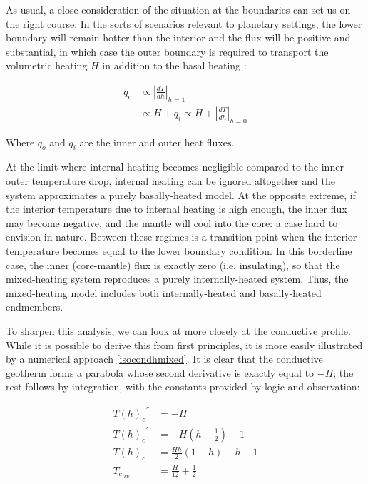 As usual, a close consideration of the situation at the boundaries can set us on the right course. In the sorts of scenarios relevant to planetary settings, the lower boundary will remain hotter than the interior and the flux will be positive and substantial, in which case the outer boundary is required to transport the volumetric heating $H$ in addition to the basal heating \cite{Moore2008-je}:

\begin{align*}
{q}_{o} &\propto {\left| \frac{dT}{dh} \right|}_{h=1} \\
&\propto H + {q}_{i} \propto H + {\left| \frac{dT}{dh} \right|}_{h=0}
\end{align*}

Where ${q}_{o}$ and ${q}_{i}$ are the inner and outer heat fluxes.

At the limit where internal heating becomes negligible compared to the inner-outer temperature drop, internal heating can be ignored altogether and the system approximates a purely basally-heated model. At the opposite extreme, if the interior temperature due to internal heating is high enough, the inner flux may become negative, and the mantle will cool into the core: a case hard to envision in nature. Between these regimes is a transition point when the interior temperature becomes equal to the lower boundary condition. In this borderline case, the inner (core-mantle) flux is exactly zero (i.e. insulating), so that the mixed-heating system reproduces a purely internally-heated system. Thus, the mixed-heating model includes both internally-heated and basally-heated endmembers.

To sharpen this analysis, we can look at more closely at the conductive profile. While it is possible to derive this from first principles, it is more easily illustrated by a numerical approach \ref{isocondhmixed}. It is clear that the conductive geotherm forms a parabola whose second derivative is exactly equal to $-H$; the rest follows by integration, with the constants provided by logic and observation:

\begin{align*}
{{T(h)}_{c}}^{''} &= -H \\
{{T(h)}_{c}}^{'} &= -H \left( h - \frac{1}{2} \right) - 1 \\
{T(h)}_{c} &= \frac{Hh}{2} \left( 1 - h \right) - h - 1 \\
{{T}_{c}}_{av} &= \frac{H}{12} + \frac{1}{2}
\end{align*}

